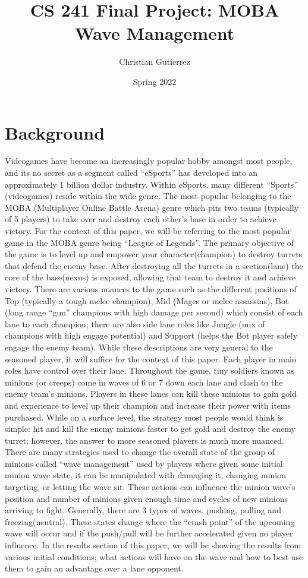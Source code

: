 \documentclass{article}
\title{CS 241 Final Project: MOBA Wave Management}
\author{Christian Gutierrez}
\date{Spring 2022}
\begin{document}
\maketitle

\newpage
\section{Background}
Videogames have become an increasingly popular hobby amongst most people, and its no secret as a segment called “eSports” has developed into an approximately 1 billion dollar industry. Within eSports, many different “Sports” (videogames) reside within the wide genre. The most popular belonging to the MOBA (Multiplayer Online Battle Arena) genre which pits two teams (typically of 5 players) to take over and destroy each other’s base in order to achieve victory. For the context of this paper, we will be referring to the most popular game in the MOBA genre being “League of Legends”. The primary objective of the game is to level up and empower your character(champion) to destroy turrets that defend the enemy base. After destroying all the turrets in a section(lane) the core of the base(nexus) is exposed, allowing that team to destroy it and achieve victory. There are various nuances to the game such as the different positions of Top (typically a tough melee champion), Mid (Mages or melee assassins), Bot (long range “gun” champions with high damage per second) which consist of each lane to each champion; there are also side lane roles like Jungle (mix of champions with high engage potential) and Support (helps the Bot player safely engage the enemy team). While these descriptions are very general to the seasoned player, it will suffice for the context of this paper. Each player in main roles have control over their lane. Throughout the game, tiny soldiers known as minions (or creeps) come in waves of 6 or 7 down each lane and clash to the enemy team’s minions. Players in these lanes can kill these minions to gain gold and experience to level up their champion and increase their power with items purchased. While on a surface level, the strategy most people would think is simple: hit and kill the enemy minions faster to get gold and destroy the enemy turret; however, the answer to more seasoned players is much more nuanced. There are many strategies used to change the overall state of the group of minions called “wave management” used by players where given some initial minion wave state, it can be manipulated with damaging it, changing minion targeting, or letting the wave sit. These actions can influence the minion wave’s position and number of minions given enough time and cycles of new minions arriving to fight. Generally, there are 3 types of waves, pushing, pulling and freezing(neutral). These states change where the “crash point” of the upcoming wave will occur and if the push/pull will be further accelerated given no player influence. In the results section of this paper, we will be showing the results from various initial conditions; what actions will have on the wave and how to best use them to gain an advantage over a lane opponent.
\newpage
\end{document}
